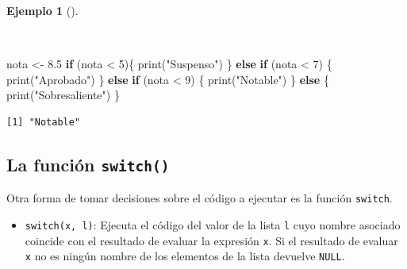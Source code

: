 \documentclass[
  a4paper,
]{scrreport}
\newenvironment{Shaded}{\begin{snugshade}}{\end{snugshade}}
\newcommand{\ControlFlowTok}[1]{\textcolor[rgb]{0.00,0.23,0.31}{\textbf{#1}}}
\newcommand{\DecValTok}[1]{\textcolor[rgb]{0.68,0.00,0.00}{#1}}
\newcommand{\FloatTok}[1]{\textcolor[rgb]{0.68,0.00,0.00}{#1}}
\newcommand{\FunctionTok}[1]{\textcolor[rgb]{0.28,0.35,0.67}{#1}}
\newcommand{\NormalTok}[1]{\textcolor[rgb]{0.00,0.23,0.31}{#1}}
\newcommand{\OtherTok}[1]{\textcolor[rgb]{0.00,0.23,0.31}{#1}}
\newcommand{\SpecialCharTok}[1]{\textcolor[rgb]{0.37,0.37,0.37}{#1}}
\newcommand{\StringTok}[1]{\textcolor[rgb]{0.13,0.47,0.30}{#1}}
\providecommand{\tightlist}{%
  \setlength{\itemsep}{0pt}\setlength{\parskip}{0pt}}\usepackage{longtable,booktabs,array}
\theoremstyle{definition}
\theoremstyle{definition}
\newtheorem{example}{Ejemplo}[chapter]
\theoremstyle{remark}
\begin{document}
\begin{example}[]\protect\hypertarget{exm-condicional-multiple}{}\label{exm-condicional-multiple}

~

\begin{Shaded}
\begin{Highlighting}[]
\NormalTok{nota }\OtherTok{\textless{}{-}} \FloatTok{8.5}
\ControlFlowTok{if}\NormalTok{ (nota }\SpecialCharTok{\textless{}} \DecValTok{5}\NormalTok{)\{}
  \FunctionTok{print}\NormalTok{(}\StringTok{"Suspenso"}\NormalTok{)}
\NormalTok{\} }\ControlFlowTok{else} \ControlFlowTok{if}\NormalTok{ (nota }\SpecialCharTok{\textless{}} \DecValTok{7}\NormalTok{) \{}
  \FunctionTok{print}\NormalTok{(}\StringTok{"Aprobado"}\NormalTok{)}
\NormalTok{\} }\ControlFlowTok{else} \ControlFlowTok{if}\NormalTok{ (nota }\SpecialCharTok{\textless{}} \DecValTok{9}\NormalTok{) \{}
  \FunctionTok{print}\NormalTok{(}\StringTok{"Notable"}\NormalTok{)}
\NormalTok{\} }\ControlFlowTok{else}\NormalTok{ \{}
  \FunctionTok{print}\NormalTok{(}\StringTok{"Sobresaliente"}\NormalTok{)}
\NormalTok{\}}
\end{Highlighting}
\end{Shaded}

\begin{verbatim}
[1] "Notable"
\end{verbatim}

\end{example}

\subsection{\texorpdfstring{La función
\texttt{switch()}}{La función switch()}}\label{la-funciuxf3n-switch}

Otra forma de tomar decisiones sobre el código a ejecutar es la función
\texttt{switch}.

\begin{itemize}
\tightlist
\item
  \texttt{switch(x,\ l)}: Ejecuta el código del valor de la lista
  \texttt{l} cuyo nombre asociado coincide con el resultado de evaluar
  la expresión \texttt{x}. Si el resultado de evaluar \texttt{x} no es
  ningún nombre de los elementos de la lista devuelve \texttt{NULL}.
\end{itemize}
\end{document}
